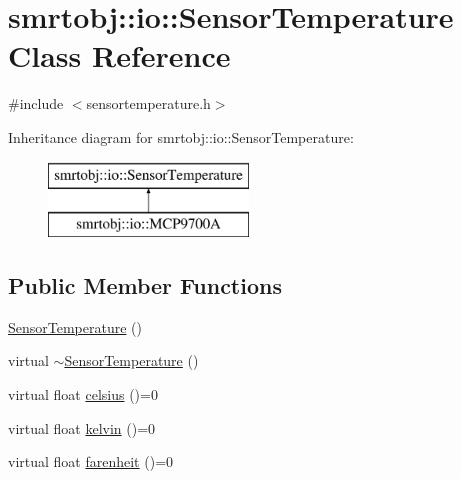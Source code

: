 \hypertarget{classsmrtobj_1_1io_1_1_sensor_temperature}{}\section{smrtobj\+:\+:io\+:\+:Sensor\+Temperature Class Reference}
\label{classsmrtobj_1_1io_1_1_sensor_temperature}


{\ttfamily \#include $<$sensortemperature.\+h$>$}

Inheritance diagram for smrtobj\+:\+:io\+:\+:Sensor\+Temperature\+:\begin{figure}[H]
\begin{center}
\leavevmode
\includegraphics[height=2.000000cm]{classsmrtobj_1_1io_1_1_sensor_temperature}
\end{center}
\end{figure}
\subsection*{Public Member Functions}
\begin{DoxyCompactItemize}
\item 
\hyperlink{classsmrtobj_1_1io_1_1_sensor_temperature_a48b0c65a7f0936a7fc1dd5925755c2b4}{Sensor\+Temperature} ()
\item 
virtual \hyperlink{classsmrtobj_1_1io_1_1_sensor_temperature_a1aee690f03a707a92288aade52571e50}{$\sim$\+Sensor\+Temperature} ()
\item 
virtual float \hyperlink{classsmrtobj_1_1io_1_1_sensor_temperature_abea20003ad3b583d8f7b6021584afabe}{celsius} ()=0
\item 
virtual float \hyperlink{classsmrtobj_1_1io_1_1_sensor_temperature_acd4a57d06be72757c3cdd5f1d14be117}{kelvin} ()=0
\item 
virtual float \hyperlink{classsmrtobj_1_1io_1_1_sensor_temperature_a042ea89c32c26955d03186cc16e049b0}{farenheit} ()=0
\end{DoxyCompactItemize}
